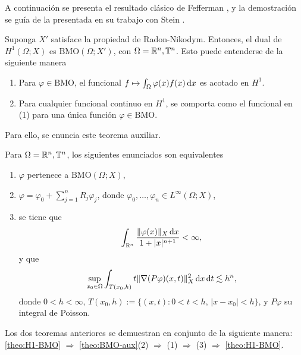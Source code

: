 A continuación se presenta el resultado clásico de Fefferman \cite{fefferman-BMO}, y la demostración se guía de la presentada en su trabajo con Stein \cite{fefferman-stein}.
\begin{theorem}[Fefferman]\label{theo:H1-BMO}
	Suponga $X'$ satisface la propiedad de Radon-Nikodym. Entonces, el dual de $H^1(\Omega;X)$ es $\mathrm{BMO}(\Omega;X')$, con $\Omega=\mathbb{R}^n,\mathbb{T}^n$. Esto puede entenderse de la siguiente manera 
	\begin{enumerate}
		\item Para $\varphi \in \mathrm{BMO}$, el funcional $f\mapsto\int_{\Omega}{\varphi(x) f(x)}\mathop{}\!\mathrm{d} x$ es acotado en $H^1$.
		\item Para cualquier funcional continuo en $H^1$, se comporta como el funcional en (1) para una única función $\varphi \in \mathrm{BMO}$.
	\end{enumerate}
\end{theorem}
Para ello, se enuncia este teorema auxiliar.
\begin{theorem}\label{theo:BMO-aux}
	Para $\Omega=\mathbb{R}^n,\mathbb{T}^n$, los siguientes enunciados son equivalentes
	\begin{enumerate}
		\item $\varphi$ pertenece a $\mathrm{BMO}(\Omega;X)$,
		\item $\varphi = \varphi_0 + \sum_{j=1}^n R_j\varphi_j$, donde $\varphi_0,\ldots,\varphi_n \in L^\infty(\Omega;X)$,
		\item se tiene que
		\begin{equation*}
			\int_{\mathbb{R}^n}\frac{\|\varphi(x)\|_{X}\mathop{}\!\mathrm{d} x}{1+|x|^{n+1}} < \infty, 
		\end{equation*}
		y que 
		\begin{equation*}
			\sup_{x_0\in\Omega}\int_{T(x_0, h)} t\|\nabla (P\varphi)(x, t)\|_{X}^2\mathop{}\!\mathrm{d} x \mathop{}\!\mathrm{d} t \lesssim h^n,
		\end{equation*}
		donde $0<h<\infty$, $T(x_0, h) := \{(x, t): 0<t<h, \, |x-x_0| < h\}$, y $P\varphi$ su integral de Poisson.
	\end{enumerate}
\end{theorem}
Los dos teoremas anteriores se demuestran en conjunto de la siguiente manera: \cref{theo:H1-BMO} $\Rightarrow$ \cref{theo:BMO-aux}(2) $\Rightarrow$ (1) $\Rightarrow$ (3) $\Rightarrow$ \cref{theo:H1-BMO}.
